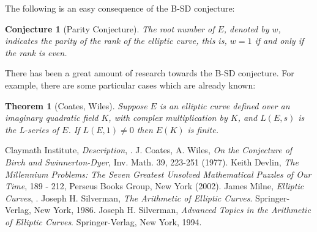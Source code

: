 \documentclass[12pt]{article}
\newtheorem{thm}{Theorem}
\newtheorem{conj}{Conjecture}
\begin{document}
The following is an easy consequence of the B-SD conjecture:
\begin{conj}[Parity Conjecture]
The root number of $E$, denoted by $w$, indicates the parity of
the rank of the elliptic curve, this is, $w=1$ if and only if the
rank is even.
\end{conj}

There has been a great amount of research towards the B-SD conjecture.
For example, there are some particular cases which are already
known:

\begin{thm}[Coates, Wiles]
Suppose $E$ is an elliptic curve defined over an imaginary quadratic
field $K$, with complex multiplication by $K$, and $L(E,s)$ is the
L-series of $E$. If $L(E,1)\neq 0$ then $E(K)$ is finite.
\end{thm}

\begin{thebibliography}{9}
 Claymath Institute, {\em Description},
.
 J. Coates, A. Wiles, {\em On the Conjecture of
Birch and Swinnerton-Dyer}, Inv. Math. 39, 223-251 (1977).
 Keith Devlin, {\it The Millennium Problems: The Seven Greatest Unsolved Mathematical Puzzles of Our Time}, 189 - 212, Perseus Books Group, New York (2002).
 James Milne, {\em Elliptic Curves}, .
 Joseph H. Silverman, {\em The Arithmetic of Elliptic Curves}. Springer-Verlag, New York, 1986.
 Joseph H. Silverman, {\em Advanced Topics in
the Arithmetic of Elliptic Curves}. Springer-Verlag, New York,
1994.
\end{thebibliography}
\end{document}

